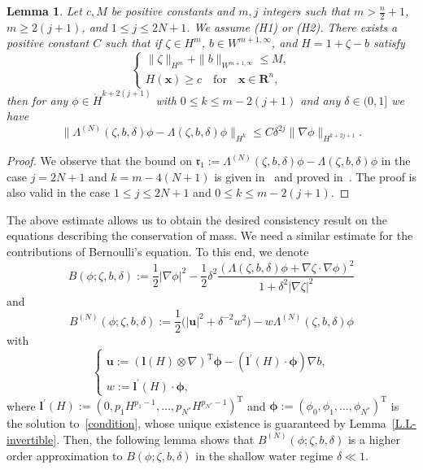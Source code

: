 \documentclass[11pt,leqno]{article}
\newtheorem{lemma}[theorem]{\bf Lemma}
\numberwithin{equation}{section}
\numberwithin{figure}{section}
\begin{document}
\begin{lemma}\label{L.L-estimate-D2N}
Let $c, M$ be positive constants and $m, j$ integers such that $m>\frac{n}{2}+1$, $m\geq2(j+1)$, and $1\leq j\leq 2N+1$. 
We assume {\rm (H1)} or {\rm (H2)}. 
There exists a positive constant $C$ such that if $\zeta\in H^m$, $b\in W^{m+1,\infty}$, and $H=1+\zeta-b$ satisfy 
%
\begin{equation}\label{eq-Hyp}
\begin{cases}
 \|\zeta\|_{H^m}+\|b\|_{W^{m+1,\infty}}\leq M, \\
 H(\bm{x})\geq c \quad\mbox{for}\quad \bm{x}\in\mathbf{R}^n,
\end{cases}
\end{equation}
%
then for any $\phi\in\mathring{H}^{k+2(j+1)}$ with $0\leq k\leq m-2(j+1)$ and any $\delta\in(0,1]$ we have 
%
\[
\|\Lambda^{(N)}(\zeta,b,\delta)\phi-\Lambda(\zeta,b,\delta)\phi\|_{H^k}
 \leq C \delta^{2j} \|\nabla \phi\|_{H^{k+2j+1}}.
\]
\end{lemma}


\begin{proof}
We observe that the bound on $\mathfrak{r}_1:=\Lambda^{(N)}(\zeta,b,\delta)\phi-\Lambda(\zeta,b,\delta)\phi$ in the case 
$j=2N+1$ and $k=m-4(N+1)$ is given in~\cite[Theorem 2.2]{Iguchi2018-2} and proved in~\cite[Sections 8.1 and 8.2]{Iguchi2018-2}. 
The proof is also valid in the case $1\leq j\leq 2N+1$ and $0\leq k\leq m-2(j+1)$. 
\end{proof}


The above estimate allows us to obtain the desired consistency result on the equations describing the conservation of mass. 
We need a similar estimate for the contributions of Bernoulli's equation. 
To this end, we denote 
%
\begin{equation}\label{def-B}
B(\phi;\zeta,b,\delta)
 := \frac12|\nabla\phi|^2 - \frac12\delta^{2}
  \frac{(\Lambda(\zeta,b,\delta)\phi+\nabla\zeta\cdot\nabla\phi)^2}{1+\delta^2|\nabla\zeta|^2}
\end{equation}
%
and 
%
\begin{equation}\label{def-BN}
B^{(N)}(\phi;\zeta,b,\delta)
 := \frac12\bigl( |{\bm u}|^2 + \delta^{-2} w^2 \bigr) - w\Lambda^{(N)}(\zeta,b,\delta)\phi
\end{equation}
%
with 
%
\[
\begin{cases}
\displaystyle
\bm{u} :=  ({\bm l}(H) \otimes \nabla)^\mathrm{T}{\bm \phi} - ( {\bm l}^\prime(H) \cdot {\bm\phi})\nabla b, \\
\displaystyle
w :={\bm l}^\prime(H) \cdot {\bm\phi},
\end{cases}
\]
%
where ${\bm l}^\prime(H) := (0,p_1 H^{p_1-1},\ldots,p_{N^*}H^{p_{N^*}-1})^\mathrm{T}$ 
and ${\bm \phi} := (\phi_0,\phi_1,\ldots,\phi_{N^*})^\mathrm{T}$ is the solution to~\eqref{condition}, 
whose unique existence is guaranteed by Lemma~\ref{L.L-invertible}. 
Then, the following lemma shows that $B^{(N)}(\phi;\zeta,b,\delta)$ is a higher order approximation 
to $B(\phi;\zeta,b,\delta)$ in the shallow water regime $\delta\ll1$. 
\end{document}
